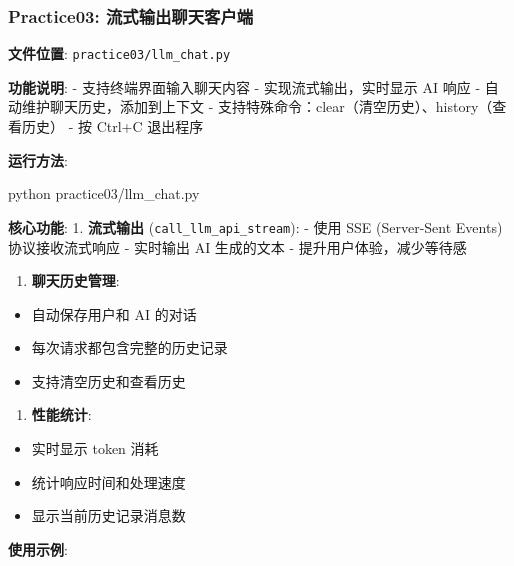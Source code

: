\documentclass[]{article}
\newenvironment{Shaded}{}{}
\newcommand{\ExtensionTok}[1]{#1}
\newcommand{\NormalTok}[1]{#1}
\providecommand{\tightlist}{%
  \setlength{\itemsep}{0pt}\setlength{\parskip}{0pt}}
\begin{document}
\subsubsection{Practice03:
流式输出聊天客户端}\label{practice03-ux6d41ux5f0fux8f93ux51faux804aux5929ux5ba2ux6237ux7aef}

\textbf{文件位置}: \texttt{practice03/llm\_chat.py}

\textbf{功能说明}: - 支持终端界面输入聊天内容 - 实现流式输出，实时显示
AI 响应 - 自动维护聊天历史，添加到上下文 -
支持特殊命令：clear（清空历史）、history（查看历史） - 按 Ctrl+C
退出程序

\textbf{运行方法}:

\begin{Shaded}
\begin{Highlighting}[]
\ExtensionTok{python}\NormalTok{ practice03/llm_chat.py}
\end{Highlighting}
\end{Shaded}

\textbf{核心功能}: 1. \textbf{流式输出}
(\texttt{call\_llm\_api\_stream}): - 使用 SSE (Server-Sent Events)
协议接收流式响应 - 实时输出 AI 生成的文本 - 提升用户体验，减少等待感

\begin{enumerate}
\def\labelenumi{\arabic{enumi}.}
\setcounter{enumi}{1}
\tightlist
\item
  \textbf{聊天历史管理}:
\end{enumerate}

\begin{itemize}
\tightlist
\item
  自动保存用户和 AI 的对话
\item
  每次请求都包含完整的历史记录
\item
  支持清空历史和查看历史
\end{itemize}

\begin{enumerate}
\def\labelenumi{\arabic{enumi}.}
\setcounter{enumi}{2}
\tightlist
\item
  \textbf{性能统计}:
\end{enumerate}

\begin{itemize}
\tightlist
\item
  实时显示 token 消耗
\item
  统计响应时间和处理速度
\item
  显示当前历史记录消息数
\end{itemize}

\textbf{使用示例}:
\end{document}
